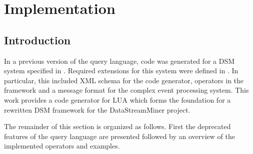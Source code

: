 \section{Implementation}
\subsection{Introduction}
In a previous version of the query language, code was generated for a DSM system
specified in \cite{285:Fischer2010}. Required extensions for this system were 
defined in \cite{297:Frey2010}. In particular, this included XML schema for the 
code generator, operators in the framework and a message format for the complex 
event processing system. This work provides a code generator for LUA which forms
the foundation for a rewritten DSM framework for the DataStreamMiner project.

The remainder of this section is organized as follows. First the deprecated 
features of the query language are presented followed by an overview of the 
implemented operators and examples. 

